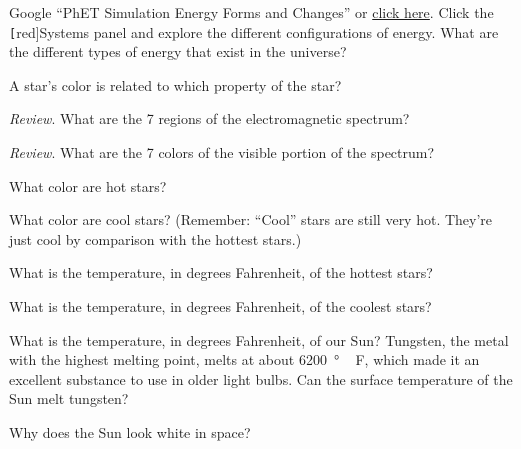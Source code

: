 \documentclass{article}
\numberwithin{equation}{section}
\numberwithin{figure}{section}
\begin{document}
\begin{exercise}
    Google ``PhET Simulation Energy Forms and Changes'' or \href{https://phet.colorado.edu/en/simulations/energy-forms-and-changes}{click here}. Click the \texttt[red]{Systems} panel and explore the different configurations of energy. What are the different types of energy that exist in the universe?
\end{exercise}

\begin{exercise}
    A star's color is related to which property of the star?
\end{exercise}

\begin{exercise}
    \textit{Review}. What are the 7 regions of the electromagnetic spectrum?
\end{exercise}

\begin{exercise}
    \textit{Review}. What are the 7 colors of the visible portion of the spectrum?
\end{exercise}

\begin{exercise}
    What color are hot stars?
\end{exercise}

\begin{exercise}
    What color are cool stars? (Remember: ``Cool'' stars are still very hot. They're just cool by comparison with the hottest stars.)
\end{exercise}

\begin{exercise}
    What is the temperature, in degrees Fahrenheit, of the hottest stars?
\end{exercise}

\begin{exercise}
    What is the temperature, in degrees Fahrenheit, of the coolest stars?
\end{exercise}

\begin{exercise}
    What is the temperature, in degrees Fahrenheit, of our Sun? Tungsten, the metal with the highest melting point, melts at about \SI{6200}{\degree\,F}, which made it an excellent substance to use in older light bulbs. Can the surface temperature of the Sun melt tungsten?
\end{exercise}

\begin{exercise}
    Why does the Sun look white in space?
\end{exercise}
\end{document}
